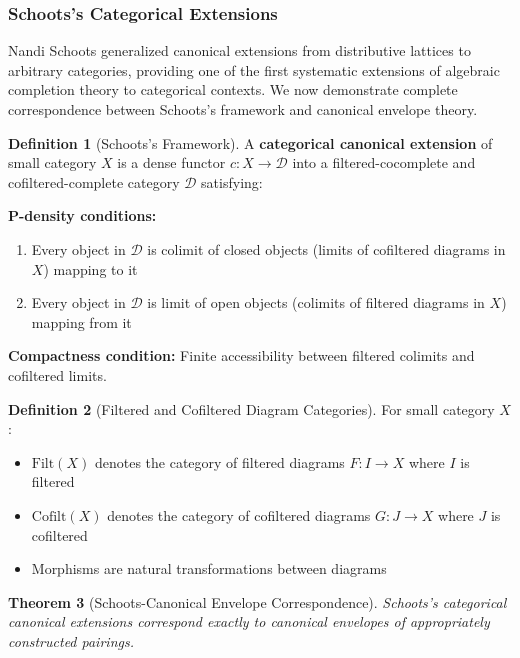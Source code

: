 \documentclass[11pt]{article}
\theoremstyle{plain}
\newtheorem{theorem}{Theorem}[section]
\theoremstyle{definition}
\newtheorem{definition}[theorem]{Definition}
\theoremstyle{remark}
\begin{document}
\subsubsection{Schoots's Categorical Extensions}

Nandi Schoots \cite{schoots2015generalising} generalized canonical extensions from distributive lattices to arbitrary categories, providing one of the first systematic extensions of algebraic completion theory to categorical contexts. We now demonstrate complete correspondence between Schoots's framework and canonical envelope theory.

\begin{definition}[Schoots's Framework]
A \textbf{categorical canonical extension} of small category $X$ is a dense functor $c : X \to \mathcal{D}$ into a filtered-cocomplete and cofiltered-complete category $\mathcal{D}$ satisfying:

\textbf{P-density conditions:}
\begin{enumerate}
\item Every object in $\mathcal{D}$ is colimit of closed objects (limits of cofiltered diagrams in $X$) mapping to it
\item Every object in $\mathcal{D}$ is limit of open objects (colimits of filtered diagrams in $X$) mapping from it
\end{enumerate}

\textbf{Compactness condition:} Finite accessibility between filtered colimits and cofiltered limits.
\end{definition}

\begin{definition}[Filtered and Cofiltered Diagram Categories]
For small category $X$:
\begin{itemize}
\item $\mathrm{Filt}(X)$ denotes the category of filtered diagrams $F : I \to X$ where $I$ is filtered
\item $\mathrm{Cofilt}(X)$ denotes the category of cofiltered diagrams $G : J \to X$ where $J$ is cofiltered
\item Morphisms are natural transformations between diagrams
\end{itemize}
\end{definition}

\begin{theorem}[Schoots-Canonical Envelope Correspondence]
Schoots's categorical canonical extensions correspond exactly to canonical envelopes of appropriately constructed pairings.
\end{theorem}
\end{document}
